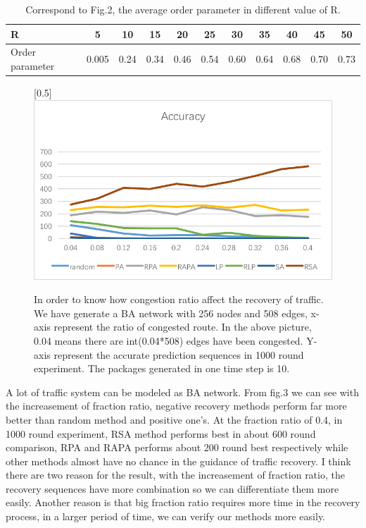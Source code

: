 \documentclass[onecolumn,preprintnumbers,amsmath,amssymb]{revtex4}
\begin{document}
\begin{table}[tbp]
\centering  %
\begin{tabular}{lcccccccccc}  %
\hline  %
R &5 &10 &15 &20 &25 &30 &35 &40 &45 &50\\ 
\hline  Order parameter &0.005 &0.24 &0.34 &0.46 &0.54 &0.60 &0.64 &0.68 &0.70 &0.73\\  
\hline
\end{tabular}
\caption{Correspond to Fig.2, the average order parameter in different value of R. }
\end{table}


\begin{figure}[ht]
\scalebox{0.5}[0.5]{\includegraphics[trim=0 10 0 0]{fractionSize.png}}
\caption{In order to know how congestion  ratio affect the recovery of traffic. We have generate a BA network with 256 nodes and 508 edges, x-axis represent the ratio of congested route. In the above picture, 0.04 means there are int(0.04*508) edges have been congested. Y-axis represent the accurate prediction sequences in 1000 round experiment. The packages generated in one time step is 10.}\label{BAZD}
\end{figure}


A lot of traffic system can be modeled as BA network. From fig.3 we can see with the increasement of fraction ratio, negative recovery methods perform far more better than random method and positive one's. At the fraction ratio of 0.4, in 1000 round experiment, RSA method performs best in about 600 round comparison, RPA and RAPA performs about 200 round best respectively while other methods almost have no chance in the guidance of traffic recovery. I think there are two reason for the result, with the increasement of fraction ratio, the recovery sequences have  more combination so we can differentiate them more easily. Another reason is that big fraction ratio requires more time in the recovery process, in a larger period of time, we can verify our methods more easily. 
\end{document}
